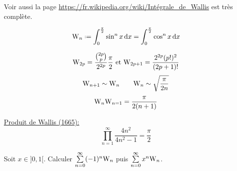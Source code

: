 Voir  aussi la page \url{https://fr.wikipedia.org/wiki/Intégrale_de_Wallis} est très complète. 

\begin{defi}
    $$\Wallis_n \defeq \int_{0}^{\frac{\pi}{2}} \sin^n x \d x = \int_{0}^{\frac{\pi}{2}} \cos^n x \d x$$
\end{defi}

\begin{prop}
    $$\mathrm{W}_{2p} = \frac{\binom{2p}{p}}{2^{2p}}\frac{\pi}{2} \text{ et } \mathrm{W}_{2p+1} = \frac{2^{2p} (p!)^2}{(2p+1)!}$$
    $$\mathrm{W}_{n+1} \sim \mathrm{W}_n \qquad \mathrm{W}_n \sim \sqrt{\frac{\pi}{2n}}$$
    $$\mathrm{W}_n \mathrm{W}_{n=1} = \frac{\pi}{2(n+1)}$$
\end{prop}

\underline{Produit de Wallis (1665):}
$$\prod_{n=1}^{\infty} \frac{4n^2}{4n^2-1} = \frac{\pi}{2}$$

\begin{exercice}
    Soit $x \in ]0,1[$. Calculer $\sum\limits_{n=0}^\infty (-1)^n \mathrm{W}_n$ puis $\sum\limits_{n=0}^\infty x^n \mathrm{W}_n$.
\end{exercice}